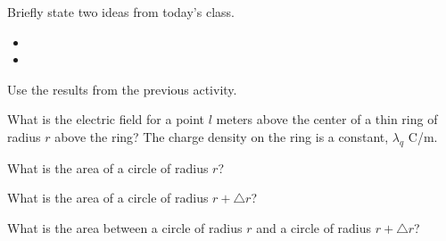 \postClass

\begin{problem}
\item Briefly state two ideas from today's class.
  \begin{itemize}
  \item
  \item
  \end{itemize}
\end{problem}


\begin{problem}
\item Use the results from the previous activity.
  \begin{subproblem}
  \item What is the electric field for a point $l$ meters above the center of a thin ring of radius $r$ above the ring?
    The charge density on the ring is a constant, $\lambda_q$ C/m.
    \vfill
  \item What is the area of a circle of radius $r$?
    \vfill
  \item What is the area of a circle of radius $r+\triangle r$?
      \vfill
  \item What is the area between a circle of radius $r$ and a circle of radius $r+\triangle r$?
      \vfill
  \end{subproblem}
\end{problem}



